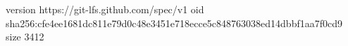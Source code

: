 version https://git-lfs.github.com/spec/v1
oid sha256:cfe4ee1681dc811e79d0c48e3451e718ecce5c848763038ed14dbbf1aa7f0cd9
size 3412
